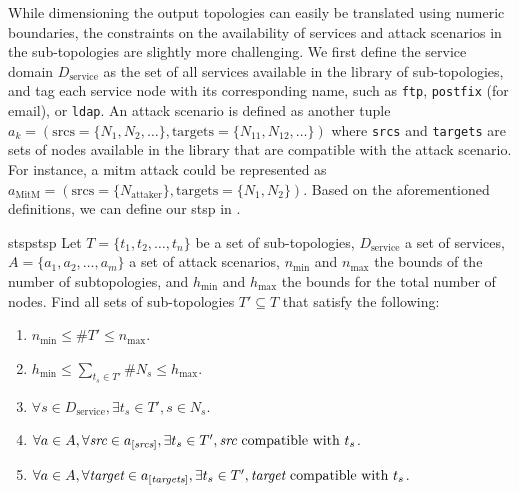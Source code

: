 While dimensioning the output topologies can easily be translated using numeric boundaries, the constraints on the availability of services and attack scenarios in the sub-topologies are slightly more challenging.
We first define the service domain $D_\text{service}$ as the set of all services available in the library of sub-topologies, and tag each service node with its corresponding name, such as \texttt{ftp}, \texttt{postfix} (for email), or \texttt{ldap}.
An attack scenario is defined as another tuple $a_k = ( \text{srcs} = \{N_1, N_2, \ldots\}, \text{targets} = \{N_{11}, N_{12}, \ldots\} ) $ where \texttt{srcs} and \texttt{targets} are sets of nodes available in the library that are compatible with the attack scenario.
For instance, a \gls{mitm} attack could be represented as $a_\text{MitM} = ( \text{srcs} = \lbrace N_\text{attaker} \rbrace, \text{targets} = \lbrace N_1, N_2 \rbrace ) $.
Based on the aforementioned definitions, we can define our \gls{stsp} in .

\begin{problembox}{\Acrfull{stsp}}{stsp}
  Let $T = \{t_1, t_2, \ldots, t_n\}$ be a set of sub-topologies, $D_\text{service}$ a set of services, $A = \{a_1, a_2, \ldots, a_m\}$ a set of attack scenarios, $n_\text{min}$ and $n_\text{max}$ the bounds of the number of subtopologies, and $h_\text{min}$ and $h_\text{max}$ the bounds for the total number of nodes.
  Find all sets of sub-topologies $T' \subseteq T$ that satisfy the following:
  \begin{enumerate}
    \normalfont
    \item $n_\text{min} \leq \#T' \leq n_\text{max}$.
    \item $h_\text{min} \leq \sum\nolimits_{t_s \in T'} \#N_s \leq h_\text{max}$.
    \item $\forall s \in D_\text{service}, \exists t_s \in T', s \in N_s$.
    \item $\forall a \in A, \forall \emph{src} \in a_{[\emph{srcs}]}, \exists t_s \in T', \emph{src} \text{ compatible with } t_s$.
    \item $\forall a \in A, \forall \emph{target} \in a_{[\emph{targets}]}, \exists t_s \in T', \emph{target} \text{ compatible with } t_s$.
  \end{enumerate}
\end{problembox}



